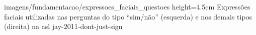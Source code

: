 \begin{enumerate}
        {imagens/fundamentacao/expressoes_faciais_questoes} %
        {height=4.5cm} %
        {Expressões faciais utilizadas nas perguntas do tipo ``sim/não'' (esquerda) e nos demais tipos (direita) na \acrshort{asl}} %
        {jay-2011-dont-just-sign} %

    



    




\end{enumerate}
